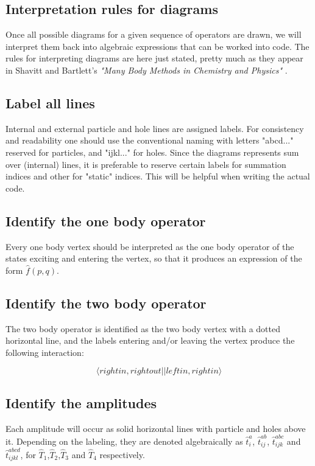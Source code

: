 \subsection{Interpretation rules for diagrams}

Once all possible diagrams for a given sequence of operators are drawn, we will interpret them back into algebraic expressions that can be worked into code. The rules for interpreting diagrams are here just stated, pretty much as they appear in Shavitt and Bartlett's \emph{"Many Body Methods in Chemistry and Physics"} \cite[Chapter 9]{ShavittBartlett2009}.

\subsection{Label all lines}

Internal and external particle and hole lines are assigned labels. For consistency and readability one should use the conventional naming with letters "abcd..." reserved for particles, and "ijkl..." for holes. Since the diagrams represents sum over (internal) lines, it is preferable to reserve certain labels for summation indices and other for "static" indices. This will be helpful when writing the actual code.

\subsection{Identify the one body operator}
Every one body vertex should be interpreted as the one body operator of the states exciting and entering the vertex, so that it produces an expression of the form $\hat{f}(p,q)$.

\subsection{Identify the two body operator}
The two body operator is identified as the two body vertex with a dotted horizontal line, and the labels entering and/or leaving the vertex produce the following interaction:

\begin{equation}
\langle right in, right out \vert \vert left in, right in \rangle
\end{equation}

\subsection{Identify the amplitudes}
Each amplitude will occur as solid horizontal lines with particle and holes above it. Depending on the labeling, they are denoted algebraically as $\hat{t}^a_i$, $\hat{t}^{ab}_{ij}$, $\hat{t}^{abc}_{ijk}$ and $\hat{t}^{abcd}_{ijkl}$, for $\hat{T}_1$,$\hat{T}_2$,$\hat{T}_3$ and $\hat{T}_4$ respectively.

